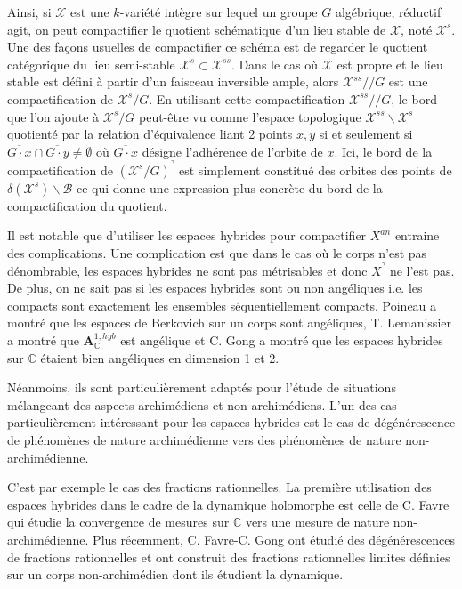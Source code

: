 \documentclass[11pt]{article}
\newcommand{\C}{\mathbb{C}}
\newcommand{\ana}{\mathbf{A}}
\begin{document}
Ainsi, si $\mathcal{X}$ est une $k$-variété intègre sur lequel un groupe $G$ algébrique, réductif agit, on peut compactifier le quotient schématique d'un lieu stable de $\mathcal{X}$, noté $\mathcal{X}^s$. Une des façons usuelles de compactifier ce schéma est de regarder le quotient catégorique du lieu semi-stable $\mathcal{X}^s \subset \mathcal{X}^{ss}$. Dans le cas où $\mathcal{X}$ est propre et le lieu stable est défini à partir d'un faisceau inversible ample, alors $\mathcal{X}^{ss}/\! /G$ est une compactification de $\mathcal{X}^s/G$. En utilisant cette compactification $\mathcal{X}^{ss}/\! /G$, le bord que l'on ajoute à $\mathcal{X}^s/G$ peut-être vu comme l'espace topologique $\mathcal{X}^{ss}\backslash \mathcal{X}^s$ quotienté par la relation d'équivalence liant 2 points $x, y$ si et seulement si $\overline{G\cdot x}\cap \overline{G\cdot y} \neq \emptyset$ où $\overline{G\cdot x}$ désigne l'adhérence de l'orbite de $x$. Ici, le bord de la compactification de $(\mathcal{X}^s/G)^\urcorner$ est simplement constitué des orbites des points de $\delta(\mathcal{X}^s) \backslash \mathcal{B}$ ce qui donne une expression plus concrète du bord de la compactification du quotient.

\bigskip

Il est notable que d'utiliser les espaces hybrides pour compactifier $X^{an}$ entraine des complications. Une complication est que dans le cas où le corps n'est pas dénombrable, les espaces hybrides ne sont pas métrisables et donc $X^\urcorner$ ne l'est pas. De plus, on ne sait pas si les espaces hybrides sont ou non angéliques i.e. les compacts sont exactement les ensembles séquentiellement compacts. Poineau \cite{PoineauAngelique} a montré que les espaces de Berkovich sur un corps sont angéliques, T. Lemanissier \cite{LemanissierComPerso} a montré que $\ana^{1,hyb}_\C$ est angélique et C. Gong \cite{GongPersonalCommunication} a montré que les espaces hybrides sur $\C$ étaient bien angéliques en dimension 1 et 2. 

Néanmoins, ils sont particulièrement adaptés pour l'étude de situations mélangeant des aspects archimédiens et non-archimédiens. L'un des cas particulièrement intéressant pour les espaces hybrides est le cas de dégénérescence de phénomènes de nature archimédienne vers des phénomènes de nature non-archimédienne. 

C'est par exemple le cas des fractions rationnelles. La première utilisation des espaces hybrides dans le cadre de la dynamique holomorphe est celle de C. Favre \cite{FavreDegenerationInHybridSpace} qui étudie la convergence de mesures sur $\C$ vers une mesure de nature non-archimédienne. Plus récemment, C. Favre-C. Gong \cite{FavreGong} ont étudié des dégénérescences de fractions rationnelles et ont construit des fractions rationnelles limites définies sur un corps non-archimédien dont ils étudient la dynamique. 
\end{document}
